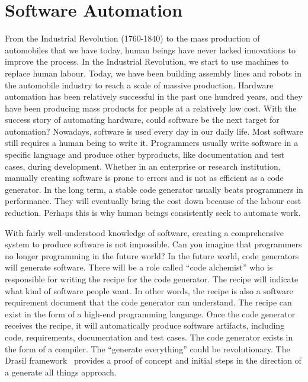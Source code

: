 \chapter{Software Automation}
From the Industrial Revolution (1760-1840) to the mass production of automobiles that we have today, human beings have never lacked innovations to improve the process. In the Industrial Revolution, we start to use machines to replace human labour. Today, we have been building assembly lines and robots in the automobile industry to reach a scale of massive production. Hardware automation has been relatively successful in the past one hundred years, and they have been producing mass products for people at a relatively low cost. With the success story of automating hardware, could software be the next target for automation? Nowadays, software is used every day in our daily life. Most software still requires a human being to write it. Programmers usually write software in a specific language and produce other byproducts, like documentation and test cases, during development. Whether in an enterprise or research institution, manually creating software is prone to errors and is not as efficient as a code generator. In the long term, a stable code generator usually beats programmers in performance. They will eventually bring the cost down because of the labour cost reduction. Perhaps this is why human beings consistently seek to automate work. 

With fairly well-understood knowledge of software, creating a comprehensive system to produce software is not impossible. Can you imagine that programmers no longer programming in the future world? In the future world, code generators will generate software. There will be a role called ``code alchemist'' who is responsible for writing the recipe for the code generator. The recipe will indicate what kind of software people want. In other words, the recipe is also a software requirement document that the code generator can understand. The recipe can exist in the form of a high-end programming language. Once the code generator receives the recipe, it will automatically produce software artifacts, including code, requirements, documentation and test cases. The code generator exists in the form of a compiler. The ``generate everything'' could be revolutionary. The Drasil framework~\citep{drasil} provides a proof of concept and initial steps in the direction of a generate all things approach.
